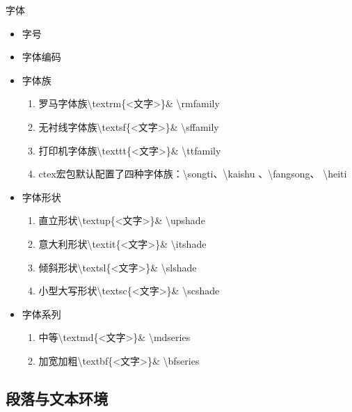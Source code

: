 字体
\begin{itemize}
\item 字号
\item 字体编码
\item 字体族
\begin{enumerate}
\item 罗马字体族\textbackslash textrm\{<文字>\}\& \textbackslash rmfamily
\item 无衬线字体族\textbackslash textsf\{<文字>\}\& \textbackslash sffamily
\item 打印机字体族\textbackslash texttt\{<文字>\}\& \textbackslash ttfamily
\item ctex宏包默认配置了四种字体族：\textbackslash songti、\textbackslash kaishu 、\textbackslash fangsong、 \textbackslash heiti
\end{enumerate}
\item 字体形状
\begin{enumerate}
	\item 直立形状\textbackslash textup\{<文字>\}\& \textbackslash upshade
	\item 意大利形状\textbackslash textit\{<文字>\}\& \textbackslash itshade
	\item 倾斜形状\textbackslash textsl\{<文字>\}\& \textbackslash slshade
	\item 小型大写形状\textbackslash textsc\{<文字>\}\& \textbackslash scshade
\end{enumerate}
\item 字体系列
\begin{enumerate}
	\item 中等\textbackslash textmd\{<文字>\}\& \textbackslash mdseries
	\item 加宽加粗\textbackslash textbf\{<文字>\}\& \textbackslash bfseries
\end{enumerate}
\end{itemize}
\subsection{段落与文本环境}















\ifx\allfiles\undefined

\fi